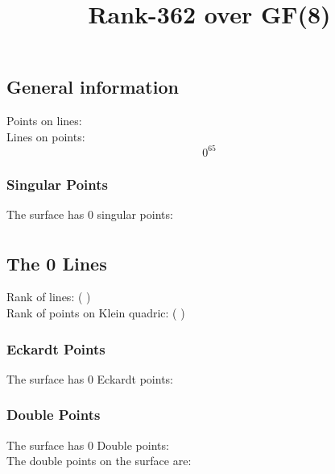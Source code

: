\documentclass{article}
\newcommand\setTBstruts{\def\T{\rule{0pt}{2.6ex}}%
\def\B{\rule[-1.2ex]{0pt}{0pt}}}
\begin{document}
 
\setTBstruts



{\allowdisplaybreaks%






\title{Rank-362 over GF(8)}
\author{}%
\maketitle%
%
{}



\subsection*{General information}
Points on lines:
$$
$$
Lines on points:
$$
0^{65}$$
\subsubsection*{Singular Points}
The surface has 0 singular points:\\
\begin{align*}
\end{align*}
\subsection*{The 0 Lines}
Rank of lines: (  )\\
Rank of points on Klein quadric: (  )\\
\subsubsection*{Eckardt Points}
The surface has 0 Eckardt points:\\
\subsubsection*{Double Points}
The surface has 0 Double points:\\
The double points on the surface are:\\
\begin{multicols}{2}
\noindent
\end{multicols}
}
\end{document}
